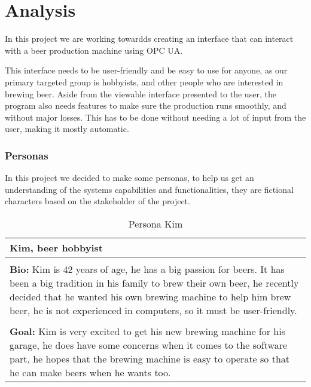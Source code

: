 
\section{Analysis}

In this project we are working towardds creating an interface that can interact with a beer production machine using OPC UA. \newline

This interface needs to be user-friendly and be easy to use for anyone, as our primary targeted group is hobbyists, and other people who are interested in brewing beer. \newline
Aside from the viewable interface presented to the user, the program also needs features to make sure the production runs smoothly, and without major losses. \newline
This has to be done without needing a lot of input from the user, making it mostly automatic.

\subsubsection{Personas}
In this project we decided to make some personas, to help us get an understanding of the systems capabilities and functionalities, they are fictional characters based on the stakeholder of the project. \newline

\begin{table}[htb]
    \begin{center}
        \begin{tabular}{|p{16cm}|}
            \hline
            \textbf{Kim, beer hobbyist}                                                                                                                                                                                                                        \\
            \hline
            \\ \textbf{Bio:} Kim is 42 years of age, he has a big passion for beers. It has been a big tradition in his family to brew their own beer, he recently decided that he wanted his own brewing machine to help him brew beer, he is not experienced in computers, so it must be user-friendly.  \\
            \\
            \textbf{Goal:} Kim is very excited to get his new brewing machine for his garage, he does have some concerns when it comes to the software part, he hopes that the brewing machine is easy to operate so that he can make beers when he wants too. \\
            \hline
        \end{tabular}
        \caption{Persona Kim}
        \label{tab:persona_kim}
    \end{center}
\end{table}

